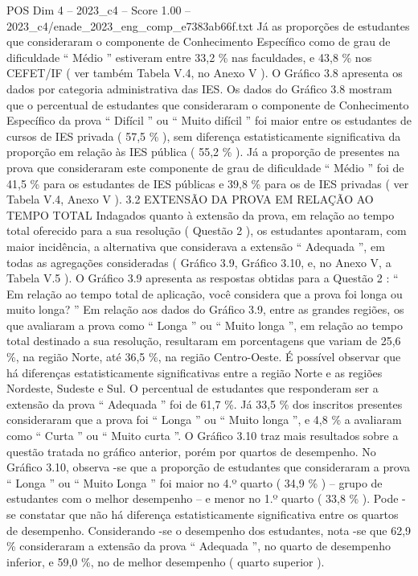 \begin{textsample}{POS Dim 4 – 2023\_c4 – Score 1.00 – 2023\_c4/enade\_2023\_eng\_comp\_e7383ab66f.txt}
Já as proporções de estudantes que consideraram o componente de Conhecimento Específico como de grau de dificuldade “ Médio ” estiveram entre 33,2 \% nas faculdades, e 43,8 \% nos CEFET/IF ( ver também Tabela V.4, no Anexo V ).
O Gráfico 3.8 apresenta os dados por categoria administrativa das IES.
Os dados do Gráfico 3.8 mostram que o percentual de estudantes que consideraram o componente de Conhecimento Específico da prova “ Difícil ” ou “ Muito difícil ” foi maior entre os estudantes de cursos de IES privada ( 57,5 \% ), sem diferença estatisticamente significativa da proporção em relação às IES pública ( 55,2 \% ).
Já a proporção de presentes na prova que consideraram este componente de grau de dificuldade “ Médio ” foi de 41,5 \% para os estudantes de IES públicas e 39,8 \% para os de IES privadas ( ver Tabela V.4, Anexo V ). 3.2 EXTENSÃO DA PROVA EM RELAÇÃO AO TEMPO TOTAL Indagados quanto à extensão da prova, em relação ao tempo total oferecido para a sua resolução ( Questão 2 ), os estudantes apontaram, com maior incidência, a alternativa que considerava a extensão “ Adequada ”, em todas as agregações consideradas ( Gráfico 3.9, Gráfico 3.10, e, no Anexo V, a Tabela V.5 ).
O Gráfico 3.9 apresenta as respostas obtidas para a Questão 2 : “ Em relação ao tempo total de aplicação, você considera que a prova foi longa ou muito longa? ” Em relação aos dados do Gráfico 3.9, entre as grandes regiões, os que avaliaram a prova como “ Longa ” ou “ Muito longa ”, em relação ao tempo total destinado a sua resolução, resultaram em porcentagens que variam de 25,6 \%, na região Norte, até 36,5 \%, na região Centro-Oeste.
É possível observar que há diferenças estatisticamente significativas entre a região Norte e as regiões Nordeste, Sudeste e Sul.
O percentual de estudantes que responderam ser a extensão da prova “ Adequada ” foi de 61,7 \%.
Já 33,5 \% dos inscritos presentes consideraram que a prova foi “ Longa ” ou “ Muito longa ”, e 4,8 \% a avaliaram como “ Curta ” ou “ Muito curta ”.
O Gráfico 3.10 traz mais resultados sobre a questão tratada no gráfico anterior, porém por quartos de desempenho.
No Gráfico 3.10, observa -se que a proporção de estudantes que consideraram a prova “ Longa ” ou “ Muito Longa ” foi maior no 4.º quarto ( 34,9 \% ) – grupo de estudantes com o melhor desempenho – e menor no 1.º quarto ( 33,8 \% ).
Pode -se constatar que não há diferença estatisticamente significativa entre os quartos de desempenho.
Considerando -se o desempenho dos estudantes, nota -se que 62,9 \% consideraram a extensão da prova “ Adequada ”, no quarto de desempenho inferior, e 59,0 \%, no de melhor desempenho ( quarto superior ).

\end{textsample}
